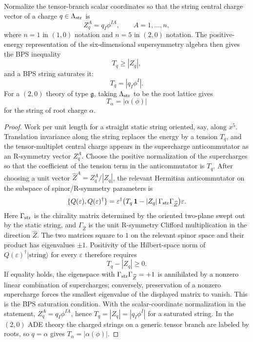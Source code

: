 \begin{proposition}
\label{prop:six-d-bps-string-tension-central-charge}
Normalize the tensor-branch scalar coordinates so that the string central
charge vector of a charge \(q\in\Lambda_{\rm str}\) is
\[
  Z_q^A=q_I\phi^{IA},\qquad A=1,\ldots,n,
\]
where \(n=1\) in \((1,0)\) notation and \(n=5\) in \((2,0)\) notation.  The
positive-energy representation of the six-dimensional supersymmetry algebra
then gives the BPS inequality
\[
  T_q\geq |Z_q|,
\]
and a BPS string saturates it:
\[
  T_q=|q_I\phi^I|.
\]
For a \((2,0)\) theory of type \(\mathfrak g\), taking
\(\Lambda_{\rm str}\) to be the root lattice gives
\[
  T_\alpha=|\alpha(\phi)|
\]
for the string of root charge \(\alpha\).
\end{proposition}

\begin{proof}
Work per unit length for a straight static string oriented, say, along
\(x^5\).  Translation invariance along the string replaces the energy by a
tension \(T_q\), and the tensor-multiplet central charge appears in the
supercharge anticommutator as an R-symmetry vector \(Z_q^A\).  Choose the
positive normalization of the supercharges so that the coefficient of the
tension term in the anticommutator is \(T_q\).  After choosing a unit vector
\(\widehat Z^A=Z_q^A/|Z_q|\), the relevant Hermitian anticommutator on the
subspace of spinor/R-symmetry parameters is
\[
  \{Q(\varepsilon),Q(\varepsilon)^\dagger\}
  =
  \varepsilon^\dagger
  \bigl(T_q\,{\bf 1}-|Z_q|\,\Gamma_{\rm str}\Gamma_{\widehat Z}\bigr)
  \varepsilon .
\]
Here \(\Gamma_{\rm str}\) is the chirality matrix determined by the oriented
two-plane swept out by the static string, and \(\Gamma_{\widehat Z}\) is the
unit R-symmetry Clifford multiplication in the direction \(\widehat Z\).  The
two matrices square to \(1\) on the relevant spinor space and their product
has eigenvalues \(\pm1\).  Positivity of the Hilbert-space norm of
\(Q(\varepsilon)^\dagger|\text{string}\rangle\) for every \(\varepsilon\)
therefore requires
\[
  T_q-|Z_q|\ge0 .
\]
If equality holds, the eigenspace with
\(\Gamma_{\rm str}\Gamma_{\widehat Z}=+1\) is annihilated by a nonzero
linear combination of supercharges; conversely, preservation of a nonzero
supercharge forces the smallest eigenvalue of the displayed matrix to
vanish.  This is the BPS saturation condition.  With the scalar-coordinate
normalization in the statement, \(Z_q^A=q_I\phi^{IA}\), hence
\(T_q=|Z_q|=|q_I\phi^I|\) for a saturated string.  In the \((2,0)\) ADE
theory the charged strings on a generic tensor branch are labeled by roots,
so \(q=\alpha\) gives \(T_\alpha=|\alpha(\phi)|\).
\end{proof}

